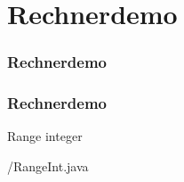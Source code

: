 \def\stitle{Rechnerdemo}
\section{\stitle}
\begin{frame}
    \frametitle{\stitle}%
\tableofcontents[current]
\end{frame}

\begin{frame}[fragile]%
  \frametitle{\stitle}%
\medskip

Range integer

{\getexercisefolder/RangeInt.java}
\end{frame}
